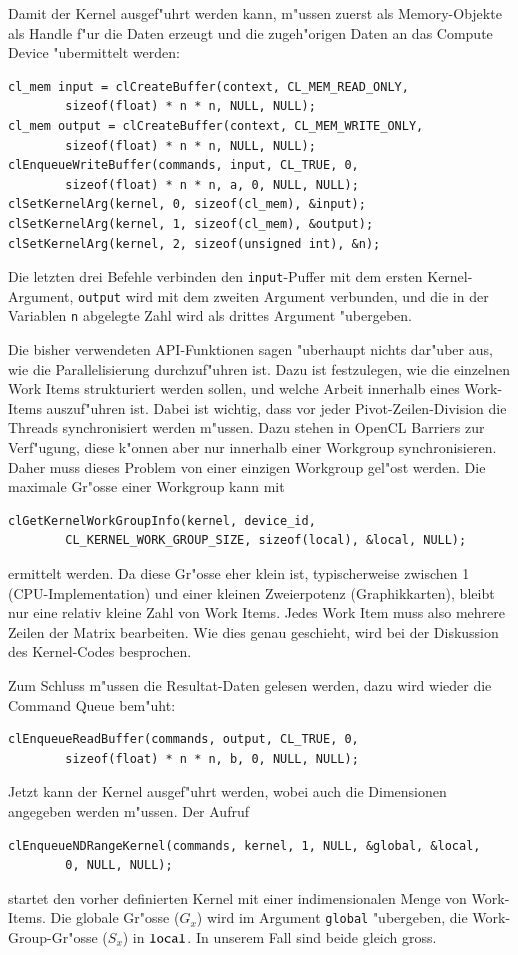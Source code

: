 Damit der Kernel ausgef"uhrt werden kann, m"ussen zuerst 
als Memory-Objekte als Handle f"ur die Daten erzeugt und die
zugeh"origen Daten an das Compute Device "ubermittelt werden:
\begin{verbatim}
cl_mem input = clCreateBuffer(context, CL_MEM_READ_ONLY,
        sizeof(float) * n * n, NULL, NULL);
cl_mem output = clCreateBuffer(context, CL_MEM_WRITE_ONLY,
        sizeof(float) * n * n, NULL, NULL);
clEnqueueWriteBuffer(commands, input, CL_TRUE, 0,
        sizeof(float) * n * n, a, 0, NULL, NULL);
clSetKernelArg(kernel, 0, sizeof(cl_mem), &input);
clSetKernelArg(kernel, 1, sizeof(cl_mem), &output);
clSetKernelArg(kernel, 2, sizeof(unsigned int), &n);
\end{verbatim}
Die letzten drei Befehle verbinden den \verb+input+-Puffer mit dem ersten
Kernel-Argument, \verb+output+ wird mit dem zweiten
Argument verbunden, und die in der Variablen \verb+n+ abgelegte
Zahl wird als drittes Argument "ubergeben.

Die bisher verwendeten API-Funktionen sagen "uberhaupt nichts dar"uber
aus, wie die Parallelisierung durchzuf"uhren ist. Dazu ist festzulegen,
wie die einzelnen Work Items strukturiert werden sollen, und welche Arbeit
innerhalb eines Work-Items auszuf"uhren ist.
Dabei ist wichtig, dass vor jeder Pivot-Zeilen-Division die Threads
synchronisiert werden m"ussen. Dazu stehen in OpenCL Barriers
zur Verf"ugung, diese k"onnen aber nur innerhalb einer Workgroup
synchronisieren. Daher muss dieses Problem von einer einzigen Workgroup
gel"ost werden. Die maximale Gr"osse einer Workgroup kann mit
\begin{verbatim}
clGetKernelWorkGroupInfo(kernel, device_id,
        CL_KERNEL_WORK_GROUP_SIZE, sizeof(local), &local, NULL);
\end{verbatim}
ermittelt werden.
Da diese Gr"osse eher klein ist, typischerweise
zwischen 1 (CPU-Implementation) und einer kleinen Zweierpotenz
(Graphikkarten), bleibt nur eine relativ kleine Zahl von Work Items.
Jedes Work Item muss also mehrere Zeilen der Matrix bearbeiten.
Wie dies genau geschieht, wird bei der Diskussion des Kernel-Codes
besprochen.

Zum Schluss m"ussen die Resultat-Daten gelesen werden, dazu wird wieder
die Command Queue bem"uht:
\begin{verbatim}
clEnqueueReadBuffer(commands, output, CL_TRUE, 0,
        sizeof(float) * n * n, b, 0, NULL, NULL);
\end{verbatim}

Jetzt kann der Kernel ausgef"uhrt werden, wobei auch die Dimensionen
angegeben werden m"ussen. Der Aufruf
\begin{verbatim}
clEnqueueNDRangeKernel(commands, kernel, 1, NULL, &global, &local,
        0, NULL, NULL);
\end{verbatim}
startet den vorher definierten Kernel mit einer indimensionalen
Menge von Work-Items. Die globale Gr"osse ($G_x$) wird im
Argument \verb+global+ "ubergeben, die Work-Group-Gr"osse ($S_x$)
in $\verb+local+$. In unserem Fall sind beide gleich gross.

